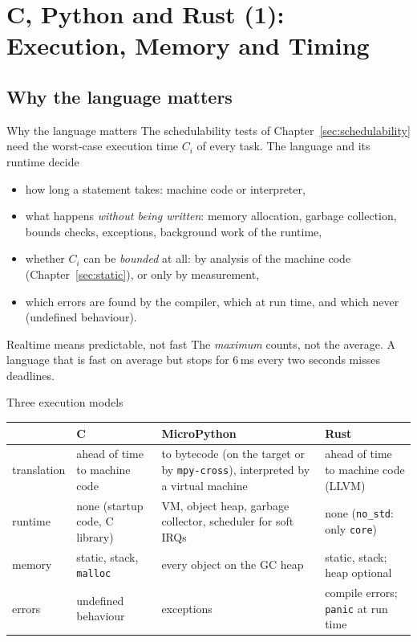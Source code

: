 \section{C, Python and Rust (1): Execution, Memory and Timing}
\label{sec:langexec}
\scriptonly{\sloppy}

\subsection{Why the language matters}
\begin{frame}{Why the language matters}
  The schedulability tests of Chapter~\ref{sec:schedulability} need the worst-case execution time $C_i$ of every task. The language and its runtime decide
  \begin{itemize}
    \item how long a statement takes: machine code or interpreter,
    \item what happens \emph{without being written}: memory allocation, garbage collection, bounds checks, exceptions, background work of the runtime,
    \item whether $C_i$ can be \emph{bounded} at all: by analysis of the machine code (Chapter~\ref{sec:static}), or only by measurement,
    \item which errors are found by the compiler, which at run time, and which never (undefined behaviour).
  \end{itemize}
  \begin{alertblock}{Realtime means predictable, not fast}
    The \emph{maximum} counts, not the average. A language that is fast on average but stops for 6\,ms every two seconds misses deadlines.
  \end{alertblock}
\end{frame}

\begin{frame}{Three execution models}
  \begin{center}\small
  \begin{tabular}{@{}p{}p{}p{}p{}@{}}
    \toprule
    & C & MicroPython & Rust \\
    \midrule
    translation & ahead of time to machine code & to bytecode (on the target or by \texttt{mpy-cross}), interpreted by a virtual machine & ahead of time to machine code (LLVM) \\
    runtime & none (startup code, C library) & VM, object heap, garbage collector, scheduler for soft IRQs & none (\texttt{no\_std}: only \texttt{core}) \\
    memory & static, stack, \texttt{malloc} & every object on the GC heap & static, stack; heap optional \\
    errors & undefined behaviour & exceptions & compile errors; \texttt{panic} at run time \\
    \bottomrule
  \end{tabular}
  \end{center}
\end{frame}

